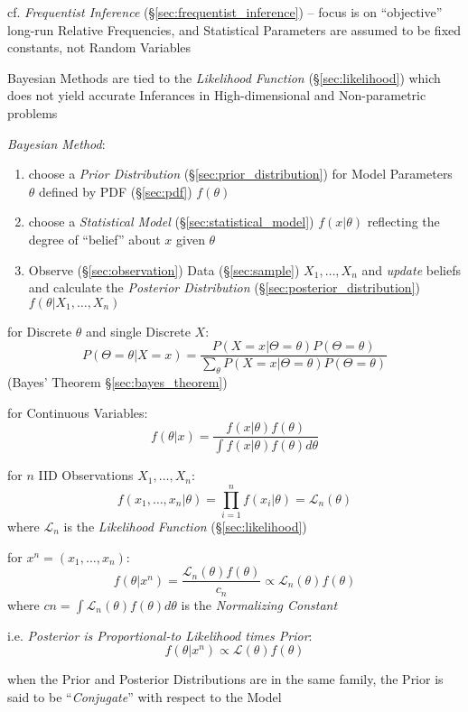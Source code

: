 cf. \emph{Frequentist Inference} (\S\ref{sec:frequentist_inference}) -- focus is
on ``objective'' long-run Relative Frequencies, and Statistical Parameters are
assumed to be fixed constants, not Random Variables

\fist Bayesian Methods are tied to the \emph{Likelihood Function}
(\S\ref{sec:likelihood}) which does not yield accurate Inferances in
High-dimensional and Non-parametric problems

\emph{Bayesian Method}:
\begin{enumerate}
  \item choose a \emph{Prior Distribution} (\S\ref{sec:prior_distribution}) for
    Model Parameters $\theta$ defined by PDF (\S\ref{sec:pdf}) $f(\theta)$
  \item choose a \emph{Statistical Model} (\S\ref{sec:statistical_model})
    $f(x|\theta)$ reflecting the degree of ``belief'' about $x$ given $\theta$
  \item Observe (\S\ref{sec:observation}) Data (\S\ref{sec:sample})
    $X_1, \ldots, X_n$ and \emph{update} beliefs and calculate the
    \emph{Posterior Distribution} (\S\ref{sec:posterior_distribution})
    $f(\theta | X_1, \ldots, X_n)$
\end{enumerate}

for Discrete $\theta$ and single Discrete $X$:
\[
  P(\Theta = \theta | X = x) = \frac{
    P(X = x|\Theta = \theta)P(\Theta = \theta)
  }{
    \sum_\theta P(X = x | \Theta = \theta) P(\Theta = \theta)
  }
\]
(Bayes' Theorem \S\ref{sec:bayes_theorem})

for Continuous Variables:
\[
  f(\theta | x) = \frac{
    f(x|\theta)f(\theta)
  }{
    \int f(x|\theta)f(\theta) d\theta
  }
\]

for $n$ IID Observations $X_1, \ldots, X_n$:
\[
  f(x_1, \ldots, x_n | \theta) =
    \prod_{i=1}^n f(x_i | \theta) = \mathcal{L}_n(\theta)
\]
where $\mathcal{L}_n$ is the \emph{Likelihood Function} (\S\ref{sec:likelihood})

for $x^n = (x_1, \ldots, x_n)$:
\[
  f(\theta|x^n) = \frac{\mathcal{L}_n(\theta)f(\theta)}{c_n}
    \propto \mathcal{L}_n(\theta)f(\theta)
\]
where $cn = \int \mathcal{L}_n(\theta)f(\theta) d\theta$ is the
\emph{Normalizing Constant}

i.e. \emph{Posterior is Proportional-to Likelihood times Prior}:
\[
  f(\theta | x^n) \propto \mathcal{L}(\theta)f(\theta)
\]

when the Prior and Posterior Distributions are in the same family, the Prior is
said to be ``\emph{Conjugate}'' with respect to the Model

